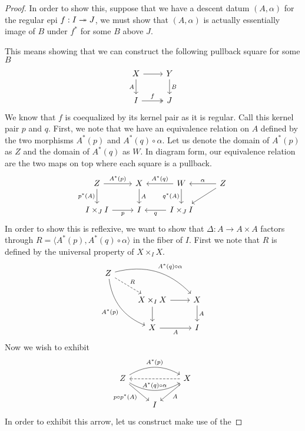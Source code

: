 \begin{proof}
  In order to show this, suppose that we have a descent datum
  $(A, \alpha)$ for the regular epi $f : I \twoheadrightarrow J$, we must show that
  $(A, \alpha)$ is actually essentially image of $B$ under $f^*$ for
  some $B$ above $J$.

  This means showing that we can construct the following pullback
  square for some $B$
  \[
    \begin{tikzcd}
      X \ar[d, swap, "A"] \ar[r] & Y \ar[d, "B"]\\
      I \ar[r, twoheadrightarrow, "f"] & J
    \end{tikzcd}
  \]
  We know that $f$ is coequalized by its kernel pair as it is regular.
  Call this kernel pair $p$ and $q$. First, we note that we have an
  equivalence relation on $A$ defined by the two morphisms $A^*(p)$
  and $A^*(q) \circ \alpha$. Let us denote the domain of $A^*(p)$ as
  $Z$ and the domain of $A^*(q)$ as $W$. In diagram form, our
  equivalence relation are the two maps on top where each square is a
  pullback.
  \[
    \begin{tikzcd}
      Z \ar[r, "A^*(p)"] \ar[d, swap, "p^*(A)"] &
      X \ar[d, "A"] &
      W \ar[l, swap, "A^*(q)"] \ar[d, swap, "q^*(A)"] &
      Z \ar[l, swap, "\alpha"] \ar[dl]\\
      {I \times_J I} \ar[r, swap, "p"] &
      I &
      {I \times_J I} \ar[l, "q"]
    \end{tikzcd}
  \]
  In order to show this is reflexive, we want to show that
  $\Delta : A \to A \times A$ factors through
  $R = \langle A^*(p), A^*(q) \circ \alpha \rangle$ in the fiber of
  $I$. First we note that $R$ is defined by the universal property of
  $X \times_I X$.
  \[
    \begin{tikzcd}
      Z \ar[ddr, bend right, swap, "A^*(p)"]
      \ar[drr, bend left, "A^*(q) \circ \alpha"]
      \ar[dr, dashed, "R"] &&\\
      &X \times_I X \ar[r] \ar[d] & X \ar[d, "A"]\\
      &X \ar[r, swap, "A"] & I
    \end{tikzcd}
  \]
  Now we wish to exhibit
  \[
    \begin{tikzcd}
      Z \ar[rr, bend left, "A^*(p)"] \ar[rr, bend right, "A^*(q) \circ \alpha"] \ar[dr, swap, "p \circ p^*(A)"]
      && X \ar[dl, "A"] \ar[ll, dashed]\\
      & I &
    \end{tikzcd}
  \]
  In order to exhibit this arrow, let us construct make use of the

\end{proof}
